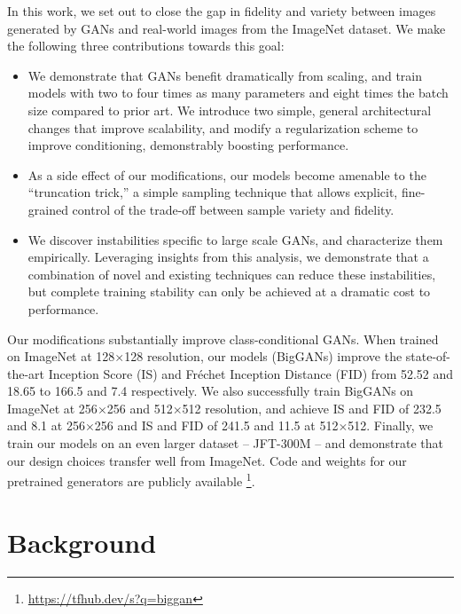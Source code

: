 \documentclass{article} %
\begin{document}
In this work, we set out to close the gap in fidelity and variety between images generated by GANs and real-world images from the ImageNet dataset. We make the following three contributions towards this goal:

\begin{itemize}
  \item We demonstrate that GANs benefit dramatically from scaling, and train models with two to four times as many parameters and eight times the batch size compared to prior art. We introduce two simple, general architectural changes that improve scalability, and modify a regularization scheme to improve conditioning, demonstrably boosting performance.

  \item As a side effect of our modifications, our models become amenable to the ``truncation trick,'' a simple sampling technique that allows explicit, fine-grained control of the trade-off between sample variety and fidelity.

  \item We discover instabilities specific to large scale GANs, and characterize them empirically. Leveraging insights from this analysis, we demonstrate that a combination of novel and existing techniques can reduce these instabilities, but complete training stability can only be achieved at a dramatic cost to performance.

  
  
\end{itemize}

Our modifications substantially improve class-conditional GANs. When trained on ImageNet at 128$\times$128 resolution, our models (BigGANs) improve the state-of-the-art Inception Score (IS) and Fr\'echet Inception Distance (FID) from 52.52 and 18.65 to 166.5 and 7.4 respectively.
We also successfully train BigGANs on ImageNet at 256$\times$256 and 512$\times$512 resolution, and achieve IS and FID of 232.5 and 8.1 at 256$\times$256 and IS and FID of 241.5 and 11.5 at 512$\times$512. Finally, we train our models on an even larger
dataset -- JFT-300M --
and demonstrate that our design choices transfer well from ImageNet. Code and weights for our pretrained generators are publicly available 
\footnote{\scriptsize \url{https://tfhub.dev/s?q=biggan}}.


\section{Background} 
\label{background}
\end{document}
